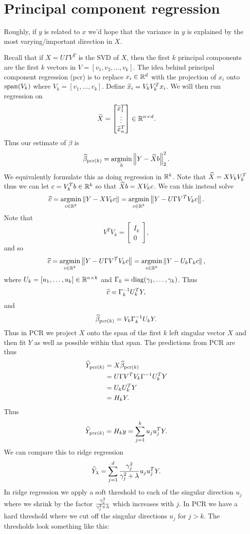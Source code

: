 \section{Principal component regression}
Roughly, if $y$ is related to $x$ we'd hope that the variance in $y$ is explained by the most varying/important direction in $X$. 

Recall that if $X = U\Gamma V^T$ is the SVD of $X$, then the first $k$ principal components are the first $k$ vectors in $V = [v_1,v_2,\ldots, v_k]$. The idea behind principal component regression (pcr) is to replace $x_i \in {\mathbb R}^d$ with the projection of $x_i$ onto $\operatorname{span}(V_k)$ where $V_k = [v_1,\ldots, v_k]$. Define $\widetilde{x}_i = V_kV_k^T x_i$. We will then run regression on 
\[\widetilde{X} = \begin{bmatrix}
    \widetilde{x}_1^T\\ \vdots \\ \widetilde{x}_n^T
\end{bmatrix} \in {\mathbb R}^{n \times d}. \]
Thus our estimate of $\beta$ is
\[\widehat{\beta}_{{\text{pcr}(k)}} = \operatorname*{argmin}_b \left\|Y-\widetilde{X}b\right\|_2^2. \]
We equivalently formulate this as doing regression in ${\mathbb R}^k$. Note that $\widetilde{X}=XV_kV_k^T$ thus we can let $c = V_k^Tb \in {\mathbb R}^k$ so that $\widetilde{X}b = XV_k c$. We can this instead solve
\[\widehat{c} = \operatorname*{argmin}_{c \in {\mathbb R}^k} \left\|Y-XV_k c\right\| = \operatorname*{argmin}_{c \in {\mathbb R}^k}\left\|Y-U\Gamma V^TV_k c\right\|. \]
Note that 
\[V^TV_k = \begin{bmatrix}
    I_k \\ 0
\end{bmatrix}, \]
and so
\[\widehat{c} = \operatorname*{argmin}_{c \in {\mathbb R}^k}\left\|Y-U\Gamma V^TV_k c\right\| = \operatorname*{argmin}_{c\in {\mathbb R}^k} \left\|Y-U_k \Gamma_k c\right\|,\]
where $U_k = [u_1,\ldots, u_k] \in {\mathbb R}^{n \times k}$ and $\Gamma_k = \operatorname*{diag}(\gamma_1,\ldots, \gamma_k)$. Thus 
\[\widehat{c} = \Gamma_k^{-1}U_k^T Y, \]
and 
\[\widehat{\beta}_{\text{pcr}(k)} =  V_k \Gamma_k^{-1} U_k Y.\]
Thus in PCR we project $X$ onto the span of the first $k$ left singular vector $X$ and then fit $Y$ as well as possible within that span. The predictions from PCR are thus 
\begin{align*}
    \widehat{Y}_{\text{pcr}(k)} &= X\widehat{\beta}_{\text{pcr}(k)} \\
    &=U\Gamma V^T V_k \Gamma^{-1} U_k^T Y\\
    &= U_k U_k^T Y\\
    &= H_k Y.
\end{align*}
Thus 
\[\widehat{Y}_{\text{pcr}(k)} = H_k y = \sum_{j=1}^k u_ju_j^TY.\] 
We can compare this to ridge regression 
\[\widehat{Y}_\lambda = \sum_{j=1}^d \frac{\gamma_j^2}{\gamma_j^2+\lambda} u_ju_j^T Y. \]
In ridge regression we apply a soft threshold to each of the singular direction $u_j$ where we shrink by the factor $\frac{\gamma_j^2}{\gamma_j^2+\lambda}$ which increases with $j$. In PCR we have a hard threshold where we cut off the singular directions $u_j$ for $j > k$. The thresholds look something like this:

